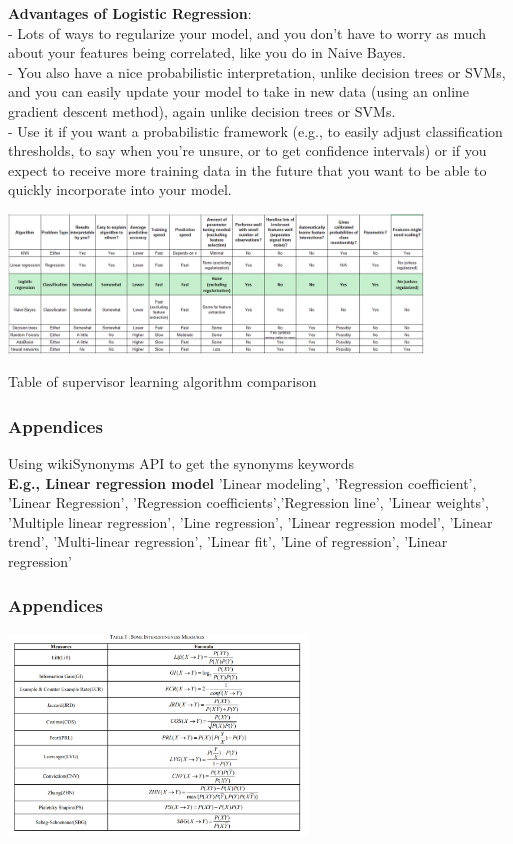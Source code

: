 \documentclass{beamer}
\begin{document}
\begin{frame}
\textbf{Advantages of Logistic Regression}: \\
- Lots of ways to regularize your model, and you don’t have to worry as much about your features being correlated, like you do in Naive Bayes. \\
- You also have a nice probabilistic interpretation, unlike decision trees or SVMs, and you can easily update your model to take in new data (using an online gradient descent method), again unlike decision trees or SVMs. \\
- Use it if you want a probabilistic framework (e.g., to easily adjust classification thresholds, to say when you’re unsure, or to get confidence intervals) or if you expect to receive more training data in the future that you want to be able to quickly incorporate into your model.
\end{frame}
\begin{frame}
\includegraphics[width=110mm]{compare.png} \\
\begin{center}
	Table of supervisor learning algorithm comparison
\end{center}
\end{frame}
\begin{frame}
\frametitle{Appendices}
 Using wikiSynonyms API to get the synonyms keywords \\
\textbf{E.g., Linear regression model }{'Linear modeling', 'Regression coefficient', 'Linear Regression', 'Regression coefficients','Regression line',  'Linear weights', 'Multiple linear regression', 'Line regression', 'Linear regression model', 'Linear trend', 'Multi-linear regression', 'Linear fit', 'Line of regression', 'Linear regression'}

\end{frame}
\begin{frame}
\frametitle{Appendices}
\begin{center}
	\includegraphics[width=80mm]{mmm.png} 
\end{center}
\end{frame}
\end{document}
